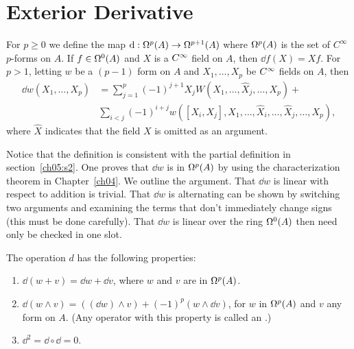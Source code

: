 \documentclass[../main]{subfiles}
\begin{document}
\section{Exterior Derivative}\label{ch07:s1}
For $p \ge 0$ we define the  map $\dd : \formbundle{A}{p} \functionMaps \formbundle{A}{p+1}$ where $\formbundle{A}{p}$ is the set of $C^\infty$ $p$-forms on $A$. If $f \in \formbundle{A}{0}$ and $X$ is a $\CInfty$ field on $A$, then $\dd f(X) = X f$. For $p > 1$, letting $w$ be a $(p - 1)$ form on $A$ and $X_1, \ldots, X_p$ be $\CInfty$ fields on $A$, then
\begin{equation}\tag{1}
\label{eqn:ch07.1}
\begin{split}
\dd w(X_1, \ldots, X_p) & = \sum_{j = 1}^p (-1)^{j + 1} X_j W(X_1, \ldots, \widehat X_j, \ldots, X_p) + \\
& \sum_{i < j} (-1)^{i + j} w([X_i, X_j], X_1, \ldots, \widehat X_i, \ldots, \widehat X_j, \ldots, X_p),
\end{split}
\end{equation}
where $\widehat X$ indicates that the field $X$ is omitted as an argument.

\par Notice that the definition is consistent with the partial definition in section~\ref{ch05:s2}. One proves that $\dd w$ is in $\formbundle{A}{p}$ by using the characterization theorem in Chapter~\ref{ch04}. We outline the argument. That $\dd w$ is linear with respect to addition is trivial. That $\dd w$ is alternating can be shown by switching two arguments and examining the terms that don't immediately change signs (this must be done carefully). That $\dd w$ is linear over the ring $\formbundle{A}{0}$ then need only be checked in one slot.



\begin{proposition} \label{prop:ch7.1.1}
The operation $d$ has the following properties:

\begin{enumerate}[label=(\arabic*)]
	\item $\dd(w + v) = \dd w + \dd v$, where $w$ and $v$ are in $\formbundle{A}{p}$.\label{enu:ch07.1.1}
	\item $\dd(w \wedge v) = ((\dd w) \wedge v) + (-1)^p (w \wedge \dd v)$, for $w$ in $\formbundle{A}{p}$ and $v$ any form on $A$. (Any operator with this property is called an .)\label{enu:ch07.1.2}
	\item $\dd^2 = \dd \circ \dd = 0$.\label{enu:ch07.1.3}
\end{enumerate}
\end{proposition}
\end{document}
